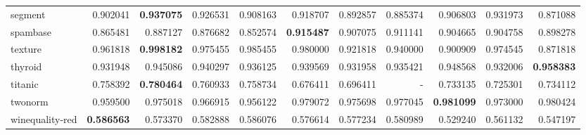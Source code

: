 \begin{tabular}{lrrrrrrrrrr}
segment         &   0.902041 &  \textbf{0.937075} &  0.926531 &  0.908163 &  0.918707 &  0.892857 &  0.885374 &  0.906803 &  0.931973 &  0.871088 \\
spambase        &   0.865481 &  0.887127 &  0.876682 &  0.852574 &  \textbf{0.915487} &  0.907075 &  0.911141 &  0.904665 &  0.904758 &  0.898278 \\
texture         &   0.961818 &  \textbf{0.998182} &  0.975455 &  0.985455 &  0.980000 &  0.921818 &  0.940000 &  0.900909 &  0.974545 &  0.871818 \\
thyroid         &   0.931948 &  0.945086 &  0.940297 &  0.936125 &  0.939569 &  0.931958 &  0.935421 &  0.948568 &  0.932006 &  \textbf{0.958383} \\
titanic         &   0.758392 &  \textbf{0.780464} &  0.760933 &  0.758734 &  0.676411 &  0.696411 &      - &  0.733135 &  0.725301 &  0.734112 \\
twonorm         &   0.959500 &  0.975018 &  0.966915 &  0.956122 &  0.979072 &  0.975698 &  0.977045 &  \textbf{0.981099} &  0.973000 &  0.980424 \\
winequality-red &   \textbf{0.586563} &  0.573370 &  0.582888 &  0.586076 &  0.576614 &  0.577234 &  0.580989 &  0.529240 &  0.561132 &  0.547197 \\
\bottomrule
\end{tabular}
